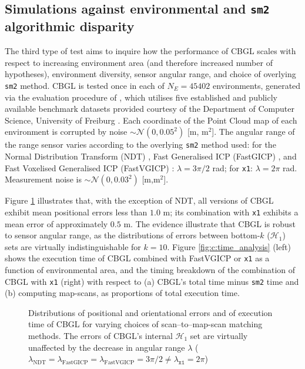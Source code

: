 \subsection{Simulations against environmental and \texttt{sm2} algorithmic disparity}
\label{subsec:exp_c}

The third type of test aims to inquire how the performance of CBGL scales with
respect to increasing environment area (and therefore increased number of
hypotheses), environment diversity, sensor angular range, and choice of
overlying \texttt{sm2} method. CBGL is tested once in each of $N_E =
45402$ environments, generated via the evaluation procedure of
\cite{Filotheou2023a}, which utilises five established and publicly available
benchmark datasets provided courtesy of the Department of Computer Science,
University of Freiburg \cite{datasets_link}. Each coordinate of the Point Cloud
map of each environment is corrupted by noise $\sim\mathcal{N}(0,0.05^2)$ [m,
m$^2$].  The angular range of the range sensor varies according to the
overlying \texttt{sm2} method used: for the Normal Distribution Transform (NDT)
\cite{ndt}, Fast Generalised ICP (FastGICP) \cite{fgi}, and Fast Voxelised
Generalised ICP (FastVGICP) \cite{fvg}: $\lambda = 3\pi/2$ rad; for
\texttt{x1}: $\lambda = 2\pi$ rad. Measurement noise is $\sim
\mathcal{N}(0,0.03^2)$ [m,m$^2$].

Figure \ref{fig:c:errors_and_time} illustrates that, with the exception of NDT,
all versions of CBGL exhibit mean positional errors less than $1.0$ m; its
combination with \texttt{x1} exhibits a mean error of approximately $0.5$ m.
The evidence illustrate that CBGL is robust to sensor angular range, as the
distributions of errors between bottom-$k$ ($\mathcal{H}_1$) sets are virtually
indistinguishable for $k=10$. Figure \ref{fig:c:time_analysis} (left) shows the
execution time of CBGL combined with FastVGICP or \texttt{x1} as a function of
environmental area, and the timing breakdown of the combination of CBGL with
\texttt{x1} (right) with respect to (a) CBGL's total time minus \texttt{sm2}
time and (b) computing map-scans, as proportions of total execution time.

\begin{figure}
  \vspace{0.3cm}
  
  \vspace{0.01cm}
  \caption{\small Distributions of positional and orientational errors and of
           execution time of CBGL for varying choices of scan--to--map-scan
           matching methods. The errors of CBGL's internal $\mathcal{H}_1$ set
           are virtually unaffected by the decrease in angular range $\lambda$
           ($\lambda_{\text{NDT}} = \lambda_{\text{FastGICP}} =
           \lambda_{\text{FastVGICP}} = 3\pi/2 \neq \lambda_{\texttt{x1}} = 2\pi$)
           }
  \label{fig:c:errors_and_time}
  \vspace{0.2cm}
\end{figure}

